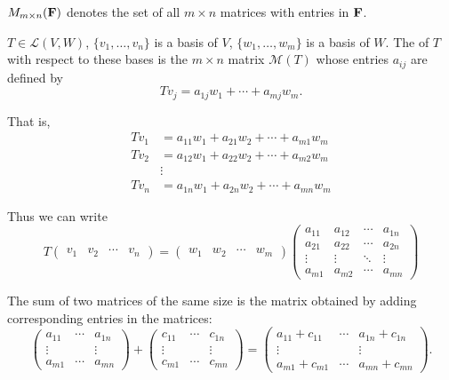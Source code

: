\begin{notation}
$M_{m\times n}(\mathbf F)$ denotes the set of all $m\times n$ matrices with entries in $\mathbf F$.
\end{notation}

\begin{definition}
$T\in\mathcal{L}(V,W)$, $\{v_1,\dots,v_n\}$ is a basis of $V$, $\{w_1,\dots,w_m\}$ is a basis of $W$. The  of $T$ with respect to these bases is the $m\times n$ matrix $\mathcal{M}(T)$ whose entries $a_{ij}$ are defined by
\[Tv_j=a_{1j}w_1+\cdots+a_{mj}w_m.\]
\end{definition}

That is,
\begin{align*}
Tv_1&=a_{11}w_1+a_{21}w_2+\cdots+a_{m1}w_m\\
Tv_2&=a_{12}w_1+a_{22}w_2+\cdots+a_{m2}w_m\\
&\vdots\\
Tv_n&=a_{1n}w_1+a_{2n}w_2+\cdots+a_{mn}w_m
\end{align*}

Thus we can write
\[T\begin{pmatrix}
v_1&v_2&\cdots&v_n
\end{pmatrix}=
\begin{pmatrix}
w_1&w_2&\cdots&w_m
\end{pmatrix}
\begin{pmatrix}
a_{11}&a_{12}&\cdots&a_{1n}\\
a_{21}&a_{22}&\cdots&a_{2n}\\
\vdots&\vdots&\ddots&\vdots\\
a_{m1}&a_{m2}&\cdots&a_{mn}
\end{pmatrix}
\]

\begin{definition}
The sum of two matrices of the same size is the matrix obtained by adding corresponding entries in the matrices:
\[\begin{pmatrix}
a_{11}&\cdots&a_{1n}\\
\vdots&&\vdots\\
a_{m1}&\cdots&a_{mn}
\end{pmatrix}+
\begin{pmatrix}
c_{11}&\cdots&c_{1n}\\
\vdots&&\vdots\\
c_{m1}&\cdots&c_{mn}
\end{pmatrix}=
\begin{pmatrix}
a_{11}+c_{11}&\cdots&a_{1n}+c_{1n}\\
\vdots&&\vdots\\
a_{m1}+c_{m1}&\cdots&a_{mn}+c_{mn}
\end{pmatrix}.\]
\end{definition}


